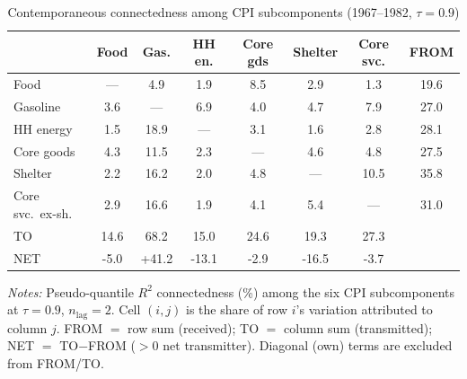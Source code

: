 \begin{table}[!ht]
\centering
\caption{Contemporaneous connectedness among CPI subcomponents (1967--1982, $\tau=0.9$)}
\label{tab:conncgi}
\setlength{\tabcolsep}{4pt}\footnotesize
\begin{threeparttable}
\begin{tabular}{l c c c c c c c}
\toprule
 & Food & Gas. & HH en. & Core gds & Shelter & Core svc. & FROM \\
\midrule
Food & --- & 4.9 & 1.9 & 8.5 & 2.9 & 1.3 & 19.6 \\
Gasoline & 3.6 & --- & 6.9 & 4.0 & 4.7 & 7.9 & 27.0 \\
HH energy & 1.5 & 18.9 & --- & 3.1 & 1.6 & 2.8 & 28.1 \\
Core goods & 4.3 & 11.5 & 2.3 & --- & 4.6 & 4.8 & 27.5 \\
Shelter & 2.2 & 16.2 & 2.0 & 4.8 & --- & 10.5 & 35.8 \\
Core svc.\ ex-sh. & 2.9 & 16.6 & 1.9 & 4.1 & 5.4 & --- & 31.0 \\
\midrule
TO & 14.6 & 68.2 & 15.0 & 24.6 & 19.3 & 27.3 &  \\
NET & -5.0 & +41.2 & -13.1 & -2.9 & -16.5 & -3.7 &  \\
\bottomrule
\end{tabular}
\begin{tablenotes}[flushleft]\footnotesize
\item \textit{Notes:} Pseudo-quantile $R^2$ connectedness (\%) among the six CPI subcomponents at $\tau=0.9$, $n_{\text{lag}}=2$. Cell $(i,j)$ is the share of row $i$'s variation attributed to column $j$. FROM $=$ row sum (received); TO $=$ column sum (transmitted); NET $=$ TO$-$FROM ($>0$ net transmitter). Diagonal (own) terms are excluded from FROM/TO.
\end{tablenotes}
\end{threeparttable}
\end{table}

